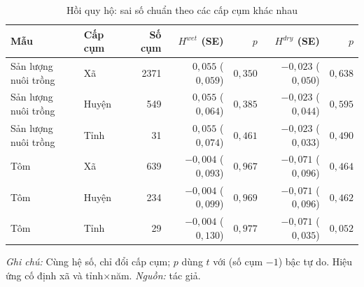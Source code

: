 \documentclass[12pt,a4paper]{article}
\begin{document}
\begin{table}[!tbp]
\centering\scriptsize
\caption{Hồi quy hộ: sai số chuẩn theo các cấp cụm khác nhau}
\label{tab:cluster}
\begin{tabular}{@{}llrrrrr@{}}
\toprule
Mẫu & Cấp cụm & Số cụm & $H^{wet}$ (SE) & $p$ & $H^{dry}$ (SE) & $p$\\
\midrule
Sản lượng nuôi trồng & Xã & 2371 & $0{,}055$ ($0{,}059$) & $0{,}350$ & $-0{,}023$ ($0{,}050$) & $0{,}638$ \\
Sản lượng nuôi trồng & Huyện & 549 & $0{,}055$ ($0{,}064$) & $0{,}385$ & $-0{,}023$ ($0{,}044$) & $0{,}595$ \\
Sản lượng nuôi trồng & Tỉnh & 31 & $0{,}055$ ($0{,}074$) & $0{,}461$ & $-0{,}023$ ($0{,}033$) & $0{,}490$ \\
Tôm & Xã & 639 & $-0{,}004$ ($0{,}093$) & $0{,}967$ & $-0{,}071$ ($0{,}096$) & $0{,}464$ \\
Tôm & Huyện & 234 & $-0{,}004$ ($0{,}099$) & $0{,}969$ & $-0{,}071$ ($0{,}096$) & $0{,}462$ \\
Tôm & Tỉnh & 29 & $-0{,}004$ ($0{,}130$) & $0{,}977$ & $-0{,}071$ ($0{,}035$) & $0{,}052$ \\
\bottomrule
\end{tabular}
\begin{minipage}{\textwidth}\footnotesize
\textit{Ghi chú:} Cùng hệ số, chỉ đổi cấp cụm; $p$ dùng $t$ với (số cụm $-1$) bậc tự do. Hiệu ứng cố định xã và tỉnh$\times$năm. \textit{Nguồn:} tác giả.
\end{minipage}
\end{table}
\end{document}
